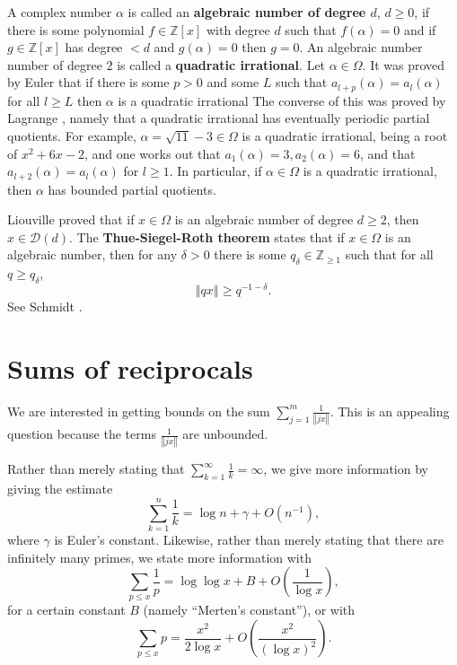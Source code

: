 \documentclass{article}
\newcommand{\norm}[1]{\left\Vert #1 \right\Vert}
\begin{document}
A complex number $\alpha$ is called an \textbf{algebraic number of degree $d$}, $d \geq 0$, if there is some polynomial $f \in \mathbb{Z}[x]$ with degree $d$ such that 
$f(\alpha)=0$ and if $g \in \mathbb{Z}[x]$ has degree $<d$ and $g(\alpha)=0$ then $g=0$. 
An algebraic number number of degree $2$ is called a \textbf{quadratic irrational}. 
Let $\alpha \in \Omega$. It was proved by Euler \cite[p.~144, Theorem 176]{wright} that if there is some $p>0$ and some $L$ such that $a_{l+p}(\alpha)=a_l(\alpha)$ for all $l \geq L$ then $\alpha$ is a quadratic irrational The converse of this was proved by Lagrange \cite[p.~144, Theorem 177]{wright},
namely that a quadratic irrational has eventually periodic 
partial quotients.
For example, $\alpha=\sqrt{11}-3 \in \Omega$ is a quadratic irrational, being a root of 
$x^2+6x-2$,
 and one works out
that $a_1(\alpha)=3, a_2(\alpha)=6$, and that $a_{l+2}(\alpha)=a_l(\alpha)$ for $l \geq 1$. 
In particular, if $\alpha \in \Omega$ is a quadratic irrational, then $\alpha$ has bounded partial quotients. 


Liouville \cite[p.~161, Theorem 191]{wright} proved that if $x \in \Omega$ is an algebraic number of degree $d \geq 2$,
then $x \in \mathcal{D}(d)$. 
The \textbf{Thue-Siegel-Roth theorem} \cite[p.~55, Theorem 1.23]{feldman} states that if $x \in \Omega$ is an algebraic number,
then for any
$\delta>0$ there  is some $q_\delta \in \mathbb{Z}_{\geq 1}$ such that for all $q \geq q_\delta$,
\[
\norm{qx} \geq q^{-1-\delta}.
\]
See Schmidt  \cite[p.~195, Theorem 2B]{schmidt}.







\section{Sums of reciprocals}
\label{reciprocalsection}
We are interested in getting bounds on the sum $\sum_{j=1}^m \frac{1}{\norm{jx}}$.
This is an appealing question because the terms $\frac{1}{\norm{jx}}$ are unbounded.

Rather than merely stating that $\sum_{k=1}^\infty \frac{1}{k}=\infty$, we give more information by giving the
 estimate 
 \[
 \sum_{k=1}^n \frac{1}{k} = \log n + \gamma + O(n^{-1}),
 \]
 where $\gamma$ is Euler's constant. Likewise, rather than merely stating that there are infinitely many primes, we state more
 information with \cite[p.~102, \S 28]{handbuch}
 \[
 \sum_{p \leq x} \frac{1}{p} = \log \log x  + B + O\left( \frac{1}{\log x} \right),
 \]
 for a certain constant $B$ (namely ``Merten's constant''),
 or with \cite[p.~226, \S 61]{handbuch}
 \[
 \sum_{p \leq x} p = \frac{x^2}{2\log x}+O\left(\frac{x^2}{(\log x)^2}\right).
 \]
\end{document}

